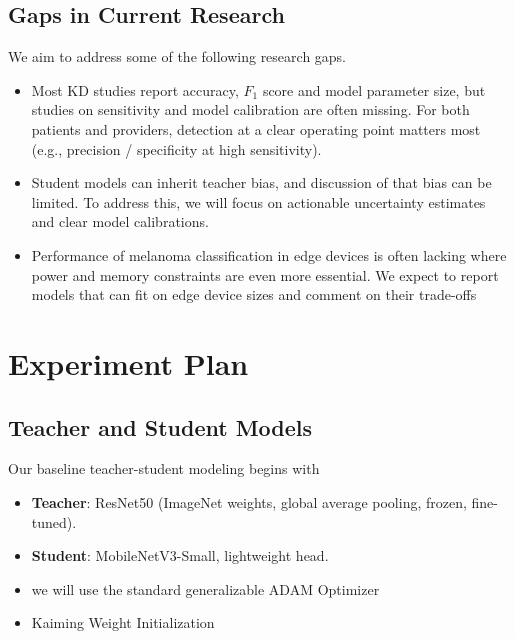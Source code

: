 \documentclass[conference]{IEEEtran}
\begin{document}
\begin{itemize}
\subsection*{Gaps in Current Research}

We aim to address some of the following research gaps.\\

\begin{itemize}
    \item Most KD studies report accuracy, $F_1$ score and model parameter size, but studies on sensitivity and model calibration are often missing. For both patients and providers, detection at a clear operating point matters most (e.g., precision / specificity at high sensitivity). \\
    \item Student models can inherit teacher bias, and discussion of that bias can be limited. To address this, we will focus on actionable uncertainty estimates and clear model calibrations.\\
    \item Performance of melanoma classification in edge devices is often lacking where power and memory constraints are even more essential. We expect to report models that can fit on edge device sizes and comment on their trade-offs 
\end{itemize}

\end{itemize}
\section*{Experiment Plan}
\subsection*{Teacher and Student Models}

Our baseline teacher-student modeling begins with

\begin{itemize}
    \item \textbf{Teacher}: ResNet50 (ImageNet weights, global average pooling, frozen, fine-tuned). 
    \item \textbf{Student}: MobileNetV3-Small, lightweight head.
    \item we will use the standard generalizable ADAM Optimizer
    \item Kaiming Weight Initialization
\end{itemize}
\end{document}
